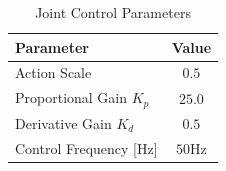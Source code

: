 \begin{table}[H]
\centering

\begin{minipage}[t]{0.48\textwidth}
\centering
\caption{Joint Control Parameters}
\vspace{0pt}
\begin{tabular}{l c}
\toprule
\textbf{Parameter} & \textbf{Value} \\
\midrule
Action Scale 
    & $0.5$ \\
Proportional Gain $K_p$ 
    & $25.0$\\
Derivative Gain $K_d$ 
    & $0.5$\\
Control Frequency [Hz] 
    & $50\text{Hz}$\\
\bottomrule
\end{tabular}

\end{minipage}
\end{table}

